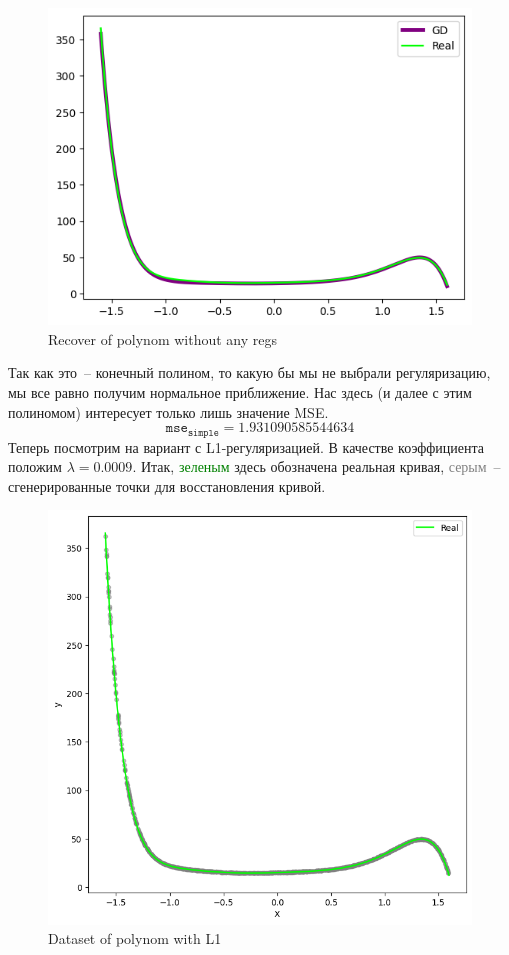 \documentclass[12pt, a4paper, oneside, final]{article}
\begin{document}
	\begin{figure}[H]
		\centering
		\includegraphics[scale = 1]{Image/AT2_V2_RECOVER.png}
		\caption*{Recover of polynom without any regs}
	\end{figure}
	Так как это~-- конечный полином, то какую бы мы не выбрали регуляризацию, мы все равно получим нормальное приближение.
	Нас здесь (и далее с этим полиномом) интересует только лишь значение MSE.
	\[
		\mathtt{mse}_{\mathtt{simple}} = 1.931090585544634
	\]
	Теперь посмотрим на вариант с L1-регуляризацией.
	В качестве коэффициента положим $\lambda = 0.0009$.
	Итак, \textcolor{green}{зеленым} здесь обозначена реальная кривая, \textcolor{gray}{серым}~-- сгенерированные точки для восстановления кривой.
	\begin{figure}[H]
		\centering
			\includegraphics[scale = 0.8]{Image/AT2_L1_V2_DATA.png}
		\caption*{Dataset of polynom with L1}
	\end{figure}
\end{document}
